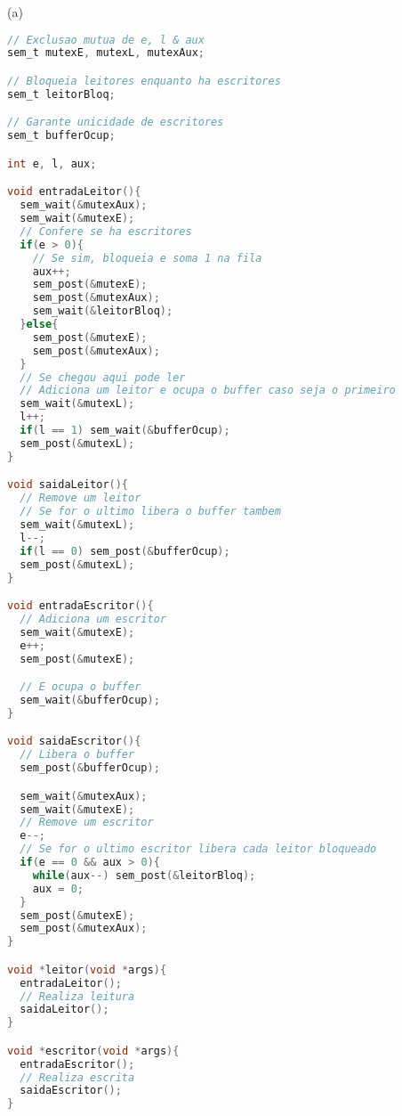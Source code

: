 \documentclass{homework}
\begin{document}
\exercise*
(a)
\begin{lstlisting}[language=C]
// Exclusao mutua de e, l & aux
sem_t mutexE, mutexL, mutexAux;

// Bloqueia leitores enquanto ha escritores
sem_t leitorBloq;

// Garante unicidade de escritores
sem_t bufferOcup;

int e, l, aux;

void entradaLeitor(){
  sem_wait(&mutexAux);
  sem_wait(&mutexE);
  // Confere se ha escritores
  if(e > 0){
    // Se sim, bloqueia e soma 1 na fila
    aux++;
    sem_post(&mutexE);
    sem_post(&mutexAux);
    sem_wait(&leitorBloq);
  }else{
    sem_post(&mutexE);
    sem_post(&mutexAux);
  }
  // Se chegou aqui pode ler
  // Adiciona um leitor e ocupa o buffer caso seja o primeiro
  sem_wait(&mutexL);
  l++;
  if(l == 1) sem_wait(&bufferOcup);
  sem_post(&mutexL); 
}

void saidaLeitor(){
  // Remove um leitor
  // Se for o ultimo libera o buffer tambem
  sem_wait(&mutexL);
  l--;
  if(l == 0) sem_post(&bufferOcup);
  sem_post(&mutexL);
}

void entradaEscritor(){
  // Adiciona um escritor
  sem_wait(&mutexE);
  e++;
  sem_post(&mutexE);

  // E ocupa o buffer
  sem_wait(&bufferOcup);
}

void saidaEscritor(){
  // Libera o buffer
  sem_post(&bufferOcup);

  sem_wait(&mutexAux);
  sem_wait(&mutexE);
  // Remove um escritor
  e--;
  // Se for o ultimo escritor libera cada leitor bloqueado
  if(e == 0 && aux > 0){
    while(aux--) sem_post(&leitorBloq);
    aux = 0;
  }
  sem_post(&mutexE);
  sem_post(&mutexAux);
}

void *leitor(void *args){
  entradaLeitor();
  // Realiza leitura
  saidaLeitor();
}

void *escritor(void *args){
  entradaEscritor();
  // Realiza escrita
  saidaEscritor();
}
\end{lstlisting}
\end{document}

